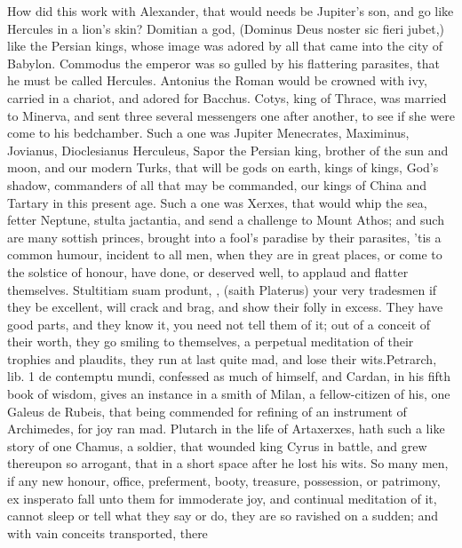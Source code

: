 {How did this work with Alexander, that would needs be Jupiter's son,
and go like Hercules in a lion's skin? Domitian a god, (Dominus
Deus noster sic fieri jubet,) like the Persian kings, whose image
was adored by all that came into the city of Babylon. Commodus the
emperor was so gulled by his flattering parasites, that he must be
called Hercules. Antonius the Roman would be crowned with ivy,
carried in a chariot, and adored for Bacchus. Cotys, king of Thrace,
was married to  Minerva, and sent three several messengers one
after another, to see if she were come to his bedchamber. Such a one
was Jupiter Menecrates, Maximinus, Jovianus, Dioclesianus
Herculeus, Sapor the Persian king, brother of the sun and moon, and our
modern Turks, that will be gods on earth, kings of kings, God's shadow,
commanders of all that may be commanded, our kings of China and Tartary
in this present age. Such a one was Xerxes, that would whip the sea,
fetter Neptune, stulta jactantia, and send a challenge to Mount Athos;
and such are many sottish princes, brought into a fool's paradise by
their parasites, 'tis a common humour, incident to all men, when they
are in great places, or come to the solstice of honour, have done, or
deserved well, to applaud and flatter themselves. Stultitiam suam
produnt, \etc{}, (saith Platerus) your very tradesmen if they be
excellent, will crack and brag, and show their folly in excess. They
have good parts, and they know it, you need not tell them of it; out of
a conceit of their worth, they go smiling to themselves, a perpetual
meditation of their trophies and plaudits, they run at last quite mad,
and lose their wits.Petrarch, lib. 1 de contemptu mundi,
confessed as much of himself, and Cardan, in his fifth book of wisdom,
gives an instance in a smith of Milan, a fellow-citizen of his,
one Galeus de Rubeis, that being commended for refining of an
instrument of Archimedes, for joy ran mad. Plutarch in the life of
Artaxerxes, hath such a like story of one Chamus, a soldier, that
wounded king Cyrus in battle, and grew thereupon so arrogant,
that in a short space after he lost his wits. So many men, if any new
honour, office, preferment, booty, treasure, possession, or patrimony,
ex insperato fall unto them for immoderate joy, and continual
meditation of it, cannot sleep or tell what they say or do, they
are so ravished on a sudden; and with vain conceits transported, there
}
